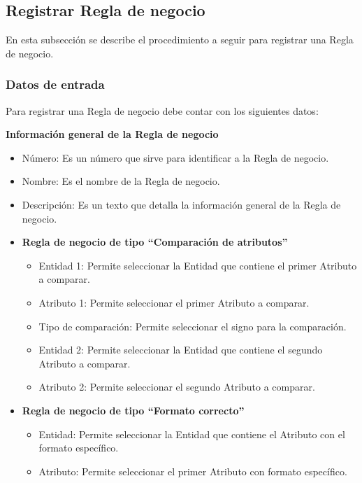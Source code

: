\subsection{Registrar Regla de negocio}
En esta subsección se describe el procedimiento a seguir para registrar una Regla de negocio.

\subsubsection{Datos de entrada}
\begin{description}
	\item Para registrar una Regla de negocio debe contar con los siguientes datos: \hspace{10pt}
	\begin{description}
	    \item \textbf{Información general de la Regla de negocio}
	    \begin{itemize}
		  \item Número: Es un número que sirve para identificar a la Regla de negocio.
		  \item Nombre: Es el nombre de la Regla de negocio.
		  \item Descripción: Es un texto que detalla la información general de la Regla de negocio.
		  \item \textbf{Regla de negocio de tipo ``Comparación de atributos''}
		  \begin{itemize}
			\item Entidad 1: Permite seleccionar la Entidad que contiene el primer Atributo a comparar.
			\item Atributo 1: Permite seleccionar el primer Atributo a comparar.
			\item Tipo de comparación: Permite seleccionar el signo para la comparación.
			\item Entidad 2: Permite seleccionar la Entidad que contiene el segundo Atributo a comparar.
			\item Atributo 2: Permite seleccionar el segundo Atributo a comparar.
		  \end{itemize}
		  \item \textbf{Regla de negocio de tipo ``Formato correcto''}
		  \begin{itemize}
			\item Entidad: Permite seleccionar la Entidad que contiene el Atributo con el formato específico.
			\item Atributo: Permite seleccionar el primer Atributo con formato específico.

\end{itemize}
\end{itemize}
\end{description}
\end{description}
